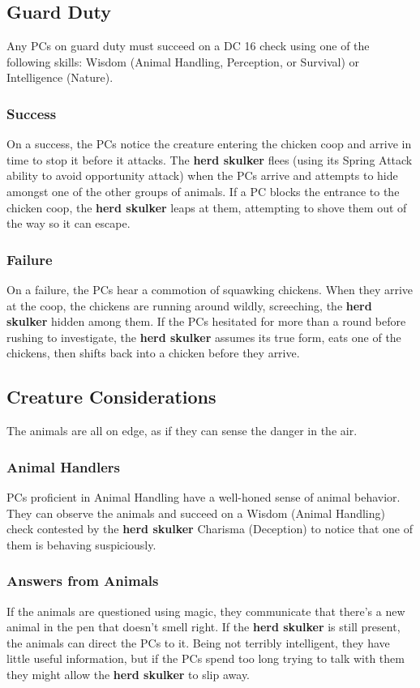 \documentclass[10pt,a4paper,twoside,bg=print,twocolumn,openany,nodeprecatedcode]{dndbook}
\begin{document}
\subsection{Guard Duty}
Any PCs on guard duty must succeed on a DC 16 check using one of the following skills: Wisdom (Animal Handling, Perception, or Survival) or Intelligence (Nature).

\subsubsection{Success}
On a success, the PCs notice the creature entering the chicken coop and arrive in time to stop it before it attacks. The \textbf{herd skulker} flees (using its Spring Attack ability to avoid opportunity attack) when the PCs arrive and attempts to hide amongst one of the other groups of animals. If a PC blocks the entrance to the chicken coop, the \textbf{herd skulker} leaps at them, attempting to shove them out of the way so it can escape.

\subsubsection{Failure}
On a failure, the PCs hear a commotion of squawking chickens. When they arrive at the coop, the chickens are running around wildly, screeching, the \textbf{herd skulker} hidden among them. If the PCs hesitated for more than a round before rushing to investigate, the \textbf{herd skulker} assumes its true form, eats one of the chickens, then shifts back into a chicken before they arrive.

\subsection{Creature Considerations}
The animals are all on edge, as if they can sense the danger in the air.

\subsubsection{Animal Handlers}
PCs proficient in Animal Handling have a well-honed sense of animal behavior. They can observe the animals and succeed on a Wisdom (Animal Handling) check contested by the \textbf{herd skulker} Charisma (Deception) to notice that one of them is behaving suspiciously.

\subsubsection{Answers from Animals}
If the animals are questioned using magic, they communicate that there's a new animal in the pen that doesn't smell right. If the \textbf{herd skulker} is still present, the animals can direct the PCs to it. Being not terribly intelligent, they have little useful information, but if the PCs spend too long trying to talk with them they might allow the \textbf{herd skulker} to slip away.
\end{document}
